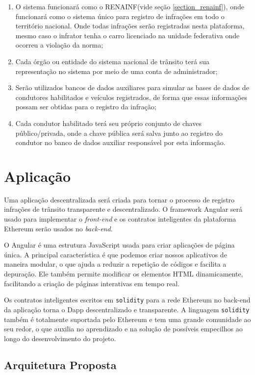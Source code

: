     \begin{enumerate}
        \item O sistema funcionará como o RENAINF(vide seção \ref{section_renainf}), onde funcionará como o sistema único para registro de infrações em todo o território nacional. Onde todas infrações serão registradas nesta plataforma, mesmo caso o infrator tenha o carro licenciado na unidade federativa onde ocorreu a violação da norma;
        \item Cada órgão ou entidade do sistema nacional de trânsito terá sua representação no sistema por meio de uma conta de administrador;
        \item Serão utilizados bancos de dados auxiliares para simular as bases de dados de condutores habilitados e veículos registrados, de forma que essas informações possam ser obtidas para o registro da infração;
        \item Cada condutor habilitado terá seu próprio conjunto de chaves público/privada, onde a chave pública será salva junto ao registro do condutor no banco de dados auxiliar responsável por esta informação.
    \end{enumerate}


\section{Aplicação}

Uma aplicação descentralizada será criada para tornar o processo de registro infrações de trânsito transparente e descentralizado. O framework Angular será usado para implementar o \textit{front-end} e os contratos inteligentes da plataforma Ethereum serão usados no \textit{back-end}. 

O Angular é uma estrutura JavaScript usada para criar aplicações de página única. A principal característica é que podemos criar nossos aplicativos de maneira modular, o que ajuda a reduzir a repetição de códigos e facilita a depuração. Ele também permite modificar os elementos HTML dinamicamente, facilitando a criação de páginas interativas em tempo real. 

Os contratos inteligentes escritos em \verb|solidity| para a rede Ethereum no back-end da aplicação torna o Dapp descentralizado e transparente. A linguagem \verb|solidity| também é totalmente suportada pelo Ethereum e tem uma grande comunidade ao seu redor, o que auxilia no aprendizado e na solução de possíveis empecilhos ao longo do desenvolvimento do projeto.

\subsection{Arquitetura Proposta}

